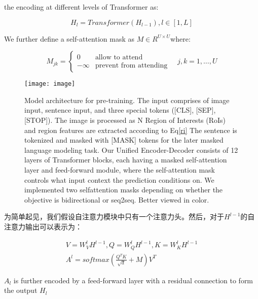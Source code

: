 \documentclass{article}
\begin{document}
\begin{sloppypar}
      the encoding at different levels of Transformer as:

      \begin{equation}
            H_l = Transformer(H_{l - 1}),l \in [1,L]
            \label{recur}
      \end{equation}


      We further define a self-attention mask as $M \in R^{U \times U}$where:

      \begin{equation}
            M_{jk} =
            \begin{cases}
                  0       & \text{allow to attend}        \\
                  -\infty & \text{prevent from attending}
            \end{cases}
            \quad j,k=1, \ldots, U
            \label{masked}
      \end{equation}

      \newpage

      \begin{figure}[h]
            \texttt{[image: image]}
            \caption{Model architecture for pre-training. The input comprises of image input, sentence input, and three special tokens ([CLS], [SEP], [STOP]). The image is processed as N Region of Interests (RoIs) and region features are extracted according to Eq\ref{ri} The sentence is tokenized and masked with [MASK] tokens for the later masked language modeling task. Our Unified Encoder-Decoder consists of 12 layers of Transformer blocks, each having a masked self-attention layer and feed-forward module, where the self-attention mask controls what input context the prediction conditions on. We implemented two selfattention masks depending on whether the objective is bidirectional or seq2seq. Better viewed in color.}
            \label{procedure}
      \end{figure}

      为简单起见，我们假设自注意力模块中只有一个注意力头。然后，对于$H^{l-1}$的自注意力输出可以表示为：

      \begin{gather}
            V=W^l_VH^{l-1},Q=W^l_QH^{l-1},K=W^l_KH^{l-1}\\
            A^l=softmax(\frac{Q^TK}{\sqrt d}+M)V^T
      \end{gather}

      $A_l$ is further encoded by a feed-forward layer with a residual connection to form the output $H_l$



\end{sloppypar}
\end{document}
